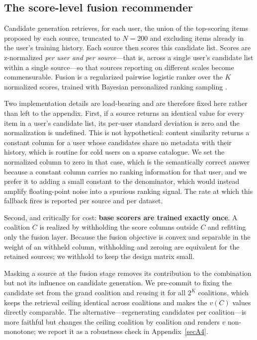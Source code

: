 \documentclass[pdflatex,sn-mathphys-num]{sn-jnl}%
\theoremstyle{thmstyleone}%
\theoremstyle{thmstyletwo}%
\theoremstyle{thmstylethree}%
\begin{document}
\subsection{The score-level fusion recommender}\label{subsec3_3}

Candidate generation retrieves, for each user, the union of the top-scoring items proposed by each source, truncated to $N=200$ and excluding items already in the user's training history. Each source then scores this candidate list. Scores are z-normalized \emph{per user and per source}---that is, across a single user's candidate list within a single source---so that sources reporting on different scales become commensurable. Fusion is a regularized pairwise logistic ranker over the $K$ normalized scores, trained with Bayesian personalized ranking sampling \cite{rendle2009}.

Two implementation details are load-bearing and are therefore fixed here rather than left to the appendix. First, if a source returns an identical value for every item in a user's candidate list, its per-user standard deviation is zero and the normalization is undefined. This is not hypothetical: content similarity returns a constant column for a user whose candidates share no metadata with their history, which is routine for cold users on a sparse catalogue. We set the normalized column to zero in that case, which is the semantically correct answer because a constant column carries no ranking information for that user, and we prefer it to adding a small constant to the denominator, which would instead amplify floating-point noise into a spurious ranking signal. The rate at which this fallback fires is reported per source and per dataset.

Second, and critically for cost: \textbf{base scorers are trained exactly once}. A coalition $C$ is realized by withholding the score columns outside $C$ and refitting only the fusion layer. Because the fusion objective is convex and separable in the weight of an withheld column, withholding and zeroing are equivalent for the retained sources; we withhold to keep the design matrix small.

Masking a source at the fusion stage removes its contribution to the combination but not its influence on candidate generation. We pre-commit to fixing the candidate set from the grand coalition and reusing it for all $2^K$ coalitions, which keeps the retrieval ceiling identical across coalitions and makes the $v(C)$ values directly comparable. The alternative---regenerating candidates per coalition---is more faithful but changes the ceiling coalition by coalition and renders $v$ non-monotone; we report it as a robustness check in Appendix~\ref{secA4}.
\end{document}
